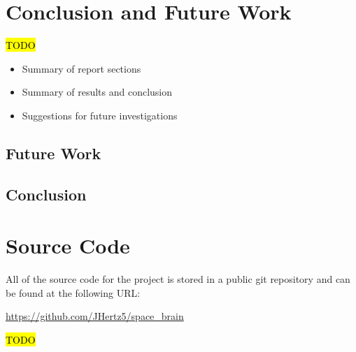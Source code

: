 \documentclass[12pt]{article}
\begin{document}
\newpage

\section{Conclusion and Future Work}
\label{sec:Conclusion}

\hl{TODO}

\begin{itemize}
\item Summary of report sections
\item Summary of results and conclusion
\item Suggestions for future investigations
\end{itemize}

\subsection{Future Work}
\label{sec:Conclusion - FW}

\subsection{Conclusion}
\label{sec:Conclusion - C}

\newpage



\nocite{*}

\newpage

\appendix
\section{Source Code}
\label{Source}

All of the source code for the project is stored in a public git repository and can be found at the following URL:

\url{https://github.com/JHertz5/space_brain}


\hl{TODO}
\end{document}
